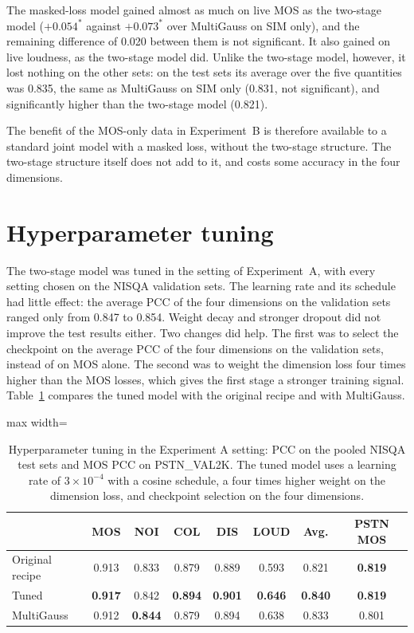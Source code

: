 \documentclass[
english,                 %
bibtex,                  %
includeExtraAbstracts, %
]{kththesis}
\numberwithin{listing}{chapter}
\begin{document}
The masked-loss model gained almost as much on live MOS as the two-stage model ($+0.054^{*}$ against $+0.073^{*}$ over MultiGauss on SIM only), and the remaining difference of 0.020 between them is not significant. It also gained on live loudness, as the two-stage model did. Unlike the two-stage model, however, it lost nothing on the other sets: on the test sets its average over the five quantities was 0.835, the same as MultiGauss on SIM only (0.831, not significant), and significantly higher than the two-stage model (0.821).

The benefit of the MOS-only data in Experiment~B is therefore available to a standard joint model with a masked loss, without the two-stage structure. The two-stage structure itself does not add to it, and costs some accuracy in the four dimensions.

\section{Hyperparameter tuning}
\label{sec:resultsTuning}

The two-stage model was tuned in the setting of Experiment~A, with every setting chosen on the NISQA validation sets. The learning rate and its schedule had little effect: the average PCC of the four dimensions on the validation sets ranged only from 0.847 to 0.854. Weight decay and stronger dropout did not improve the test results either. Two changes did help. The first was to select the checkpoint on the average PCC of the four dimensions on the validation sets, instead of on MOS alone. The second was to weight the dimension loss four times higher than the MOS losses, which gives the first stage a stronger training signal. Table~\ref{tab:tuning} compares the tuned model with the original recipe and with MultiGauss.

\begin{table}[!ht]
  \centering
  \caption{Hyperparameter tuning in the Experiment A setting: PCC on the pooled NISQA test sets and MOS PCC on PSTN\_VAL2K. The tuned model uses a learning rate of $3\times10^{-4}$ with a cosine schedule, a four times higher weight on the dimension loss, and checkpoint selection on the four dimensions.}
  \label{tab:tuning}
  \setlength{\tabcolsep}{4pt}
  \begin{adjustbox}{max width=\textwidth}
  \begin{tabular}{lccccccc}
    \toprule
     & MOS & NOI & COL & DIS & LOUD & Avg. & PSTN MOS \\
    \midrule
    Original recipe & 0.913 & 0.833 & 0.879 & 0.889 & 0.593 & 0.821 & \textbf{0.819} \\
    Tuned           & \textbf{0.917} & 0.842 & \textbf{0.894} & \textbf{0.901} & \textbf{0.646} & \textbf{0.840} & \textbf{0.819} \\
    MultiGauss      & 0.912 & \textbf{0.844} & 0.879 & 0.894 & 0.638 & 0.833 & 0.801 \\
    \bottomrule
  \end{tabular}
  \end{adjustbox}
\end{table}
\end{document}
